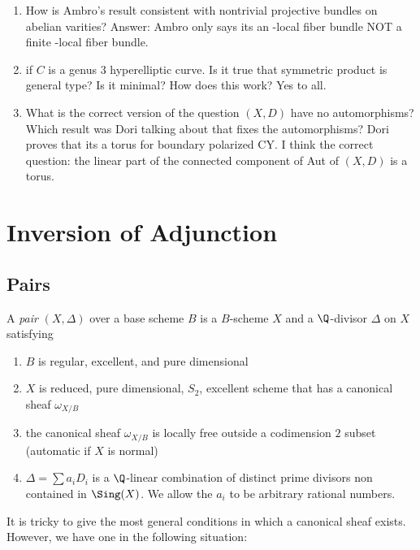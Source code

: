 \documentclass[12pt]{article}
\begin{document}
\begin{enumerate}
\item How is Ambro's result consistent with nontrivial projective bundles on abelian varities? Answer: Ambro only says its an \etale-local fiber bundle NOT a finite \etale-local fiber bundle.

\item if $C$ is a genus $3$ hyperelliptic curve. Is it true that symmetric product is general type? Is it minimal? How does this work? Yes to all. 

\item What is the correct version of the question $(X, D)$ have no automorphisms? Which result was Dori talking about that fixes the automorphisms? Dori proves that its a torus for boundary polarized CY. I think the correct question: the linear part of the connected component of Aut of $(X, D)$ is a torus. 
\end{enumerate}

\section{Inversion of Adjunction}


\subsection{Pairs}

\begin{defn}
A \textit{pair} $(X, \Delta)$ over a base scheme $B$ is a $B$-scheme $X$ and a $\Q$-divisor $\Delta$ on $X$ satisfying
\begin{enumerate}
\item $B$ is regular, excellent, and pure dimensional
\item $X$ is reduced, pure dimensional, $S_2$, excellent scheme that has a canonical sheaf $\omega_{X/B}$
\item the canonical sheaf $\omega_{X/B}$ is locally free outside a codimension $2$ subset (automatic if $X$ is normal)
\item $\Delta = \sum a_i D_i$ is a $\Q$-linear combination of distinct prime divisors non contained in $\Sing(X)$. We allow the $a_i$ to be arbitrary rational numbers. 
\end{enumerate}
\end{defn}

It is tricky to give the most general conditions in which a canonical sheaf exists. However, we have one in the following situation:
\end{document}
